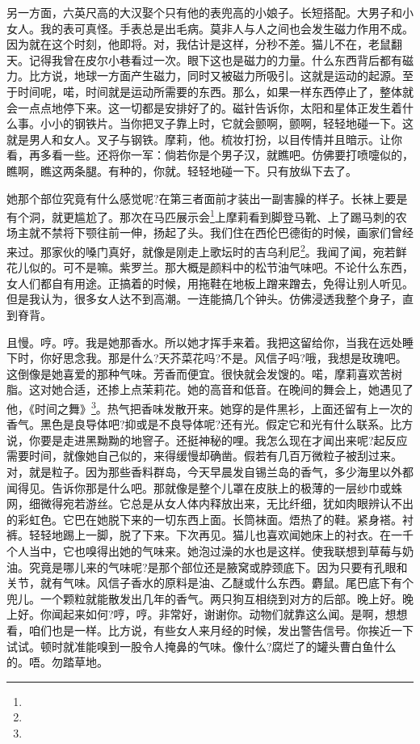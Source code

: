 \par 另一方面，六英尺高的大汉娶个只有他的表兜高的小娘子。长短搭配。大男子和小女人。我的表可真怪。手表总是出毛病。莫非人与人之间也会发生磁力作用不成。因为就在这个时刻，他即将。对，我估计是这样，分秒不差。猫儿不在，老鼠翻天。记得我曾在皮尔小巷看过一次。眼下这也是磁力的力量。什么东西背后都有磁力。比方说，地球一方面产生磁力，同时又被磁力所吸引。这就是运动的起源。至于时间呢，喏，时间就是运动所需要的东西。那么，如果一样东西停止了，整体就会一点点地停下来。这一切都是安排好了的。磁针告诉你，太阳和星体正发生着什么事。小小的钢铁片。当你把叉子靠上时，它就会颤啊，颤啊，轻轻地碰一下。这就是男人和女人。叉子与钢铁。摩莉，他。梳妆打扮，以目传情并且暗示。让你看，再多看一些。还将你一军：倘若你是个男子汉，就瞧吧。仿佛要打喷嚏似的，瞧啊，瞧这两条腿。有种的，你就。轻轻地碰一下。只有放纵下去了。
\par 她那个部位究竟有什么感觉呢?在第三者面前才装出一副害臊的样子。长袜上要是有个洞，就更尴尬了。那次在马匹展示会\footnote{}上摩莉看到脚登马靴、上了踢马刺的农场主就不禁将下颚往前一伸，扬起了头。我们住在西伦巴德街的时候，画家们曾经来过。那家伙的嗓门真好，就像是刚走上歌坛时的吉乌利尼\footnote{}。我闻了闻，宛若鲜花儿似的。可不是嘛。紫罗兰。那大概是颜料中的松节油气味吧。不论什么东西，女人们都自有用途。正搞着的时候，用拖鞋在地板上蹭来蹭去，免得让别人听见。但是我认为，很多女人达不到高潮。一连能搞几个钟头。仿佛浸透我整个身子，直到脊背。
\par 且慢。哼。哼。我是她那香水。所以她才挥手来着。我把这留给你，当我在远处睡下时，你好思念我。那是什么?天芥菜花吗?不是。风信子吗?哦，我想是玫瑰吧。这倒像是她喜爱的那种气味。芳香而便宜。很快就会发馊的。喏，摩莉喜欢苦树脂。这对她合适，还掺上点茉莉花。她的高音和低音。在晚间的舞会上，她遇见了他，《时间之舞》\footnote{}。热气把香味发散开来。她穿的是件黑衫，上面还留有上一次的香气。黑色是良导体吧?抑或是不良导体呢?还有光。假定它和光有什么联系。比方说，你要是走进黑黝黝的地窨子。还挺神秘的哩。我怎么现在才闻出来呢?起反应需要时间，就像她自己似的，来得缓慢却确凿。假若有几百万微粒子被刮过来。对，就是粒子。因为那些香料群岛，今天早晨发自锡兰岛的香气，多少海里以外都闻得见。告诉你那是什么吧。那就像是整个儿罩在皮肤上的极薄的一层纱巾或蛛网，细微得宛若游丝。它总是从女人体内释放出来，无比纤细，犹如肉眼辨认不出的彩虹色。它巴在她脱下来的一切东西上面。长筒袜面。焐热了的鞋。紧身褡。衬裤。轻轻地踢上一脚，脱了下来。下次再见。猫儿也喜欢闻她床上的衬衣。在一千个人当中，它也嗅得出她的气味来。她泡过澡的水也是这样。使我联想到草莓与奶油。究竟是哪儿来的气味呢?是那个部位还是腋窝或脖颈底下。因为只要有孔眼和关节，就有气味。风信子香水的原料是油、乙醚或什么东西。麝鼠。尾巴底下有个兜儿。一个颗粒就能散发出几年的香气。两只狗互相绕到对方的后部。晚上好。晚上好。你闻起来如何?哼，哼。非常好，谢谢你。动物们就靠这么闻。是啊，想想看，咱们也是一样。比方说，有些女人来月经的时候，发出警告信号。你挨近一下试试。顿时就准能嗅到一股令人掩鼻的气味。像什么?腐烂了的罐头曹白鱼什么的。唔。勿踏草地。
